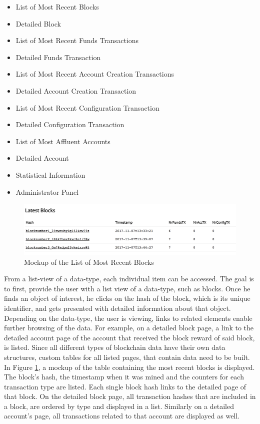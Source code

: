 \begin{itemize}
\item{List of Most Recent Blocks}
\item{Detailed Block}
\item{List of Most Recent Funds Transactions}
\item{Detailed Funds Transaction}
\item{List of Most Recent Account Creation Transactions}
\item{Detailed Account Creation Transaction}
\item{List of Most Recent Configuration Transaction}
\item{Detailed Configuration Transaction}
\item{List of Most Affluent Accounts}
\item{Detailed Account}
\item{Statistical Information}
\item{Administrator Panel}
\end{itemize}

\begin{figure}
  \includegraphics[width=\linewidth]{mockup1.png}
  \centering
  \caption{Mockup of the List of Most Recent Blocks}
  \label{fig:mockup1}
\end{figure}

From a list-view of a data-type, each individual item can be accessed. The goal is to first, provide the user with a list view of a data-type, such as blocks. Once he finds an object of interest, he clicks on the hash of the block, which is its unique identifier, and gets presented with detailed information about that object. Depending on the data-type, the user is viewing, links to related elements enable further browsing of the data. For example, on a detailed block page, a link to the detailed account page of the account that received the block reward of said block, is listed. Since all different types of blockchain data have their own data structures, custom tables for all listed pages, that contain data need to be built. In Figure \ref{fig:mockup1}, a mockup of the table containing the most recent blocks is displayed. The block's hash, the timestamp when it was mined and the counters for each transaction type are listed. Each single block hash links to the detailed page of that block. On the detailed block page, all transaction hashes that are included in a block, are ordered by type and displayed in a list. Similarly on a detailed account's page, all transactions related to that account are displayed as well.

